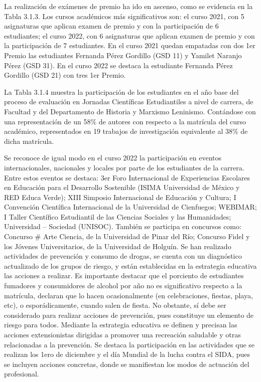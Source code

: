 La realización de exámenes de premio ha ido en ascenso, como se evidencia en la Tabla 3.1.3. Los cursos académicos más significativos son: el curso 2021, con 5 asignaturas que aplican examen de premio y con la participación de 6 estudiantes; el curso 2022, con 6 asignaturas que aplican examen de premio y con la participación de 7 estudiantes. En el curso 2021 quedan empatadas con dos 1er Premio las estudiantes Fernanda Pérez Gordillo (GSD 11) y Yamilet Naranjo Pérez (GSD 31). En el curso 2022 se destaca la estudiante Fernanda Pérez Gordillo (GSD 21) con tres 1er Premio.



La Tabla 3.1.4 muestra la participación de los estudiantes en el año base del proceso de evaluación en Jornadas Científicas Estudiantiles a nivel de carrera, de Facultad y del Departamento de Historia y Marxismo Leninismo. Contándose con una representación de un 58\% de autores con respecto a la matrícula del curso académico, representados en 19 trabajos de investigación equivalente al 38\% de dicha matrícula.

Se reconoce de igual modo en el curso 2022 la participación en eventos internacionales, nacionales y locales por parte de los estudiantes de la carrera. Entre estos eventos se destaca: 3er Foro Internacional de Experiencias Escolares en Educación para el Desarrollo Sostenible (ISIMA Universidad de México y RED Educa Verde); XIII Simposio Internacional de Educación y Cultura; I Convención Científica Internacional de la Universidad de Cienfuegos; WEBIMAR; I Taller Científico Estudiantil de las Ciencias Sociales y las Humanidades; Universidad – Sociedad (UNISOC). También se participa en concursos como: Concurso \# Arte Ciencia, de la Universidad de Pinar del Río; Concurso Fidel y los Jóvenes Universitarios, de la Universidad de Holguín.
Se han realizado actividades de prevención y consumo de drogas, se cuenta con un diagnóstico actualizado de los grupos de riesgo, y están establecidas en la estrategia educativa las acciones a realizar. Es importante destacar que el porciento de estudiantes fumadores y consumidores de alcohol por año no es significativo respecto a la matrícula, declaran que lo hacen ocasionalmente (en celebraciones, fiestas, playa, etc), o esporádicamente, cuando salen de fiesta. No obstante, sí debe ser considerado para realizar acciones de prevención, pues constituye un elemento de riesgo para todos.
Mediante la estrategia educativa se definen y precisan las acciones extensionistas dirigidas a promover una recreación saludable y otras relacionadas a la prevención. Se destaca la participación en las actividades que se realizan los 1ero de diciembre y el día Mundial de la lucha contra el SIDA, pues se incluyen acciones concretas, donde se manifiestan los modos de actuación del profesional.